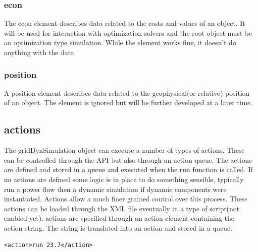 \documentclass[12pt]{article} %
\begin{document}
\subsubsection{econ}
The econ element describes data related to the costs and values of an object.  It will be used for interaction with optimization solvers and the root object must be an optimization type simulation.  While the element works fine, it doesn't do anything with the data. 

\subsubsection{position}
A position element describes data related to the geophysical(or relative) position of an object.  The element is ignored but will be further developed at a later time.  

\subsection{actions}\label{section:action}
The gridDynSimulation object can execute a number of types of actions.  These can be controlled through the API but also through an action queue.  The actions are defined and stored in a queue and executed when the run function is called.  If no actions are defined some logic is in place to do something sensible, typically run a power flow then a dynamic simulation if dynamic components were instantiated.  Actions allow a much finer grained control over this process.  These actions can be loaded through the XML file eventually in a type of script(not enabled yet).  
actions are specified through an action element containing the action string.  The string is translated into an action and stored in a queue.  
\begin{verbatim}
<action>run 23.7</action>
\end{verbatim}
\end{document}
